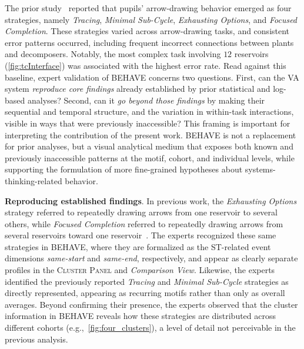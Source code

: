 \documentclass[letterpaper,journal]{IEEEtran}
\begin{document}
The prior study~\cite{host2026pupils} reported that pupils' arrow-drawing behavior emerged as four strategies, namely \textit{Tracing}, \textit{Minimal Sub-Cycle}, \textit{Exhausting Options}, and \textit{Focused Completion}. These strategies varied across arrow-drawing tasks, and consistent error patterns occurred, including frequent incorrect connections between plants and decomposers.
Notably, the most complex task involving $12$ reservoirs (\cref{fig:tcInterface}) was associated with the highest error rate.
Read against this baseline, expert validation of \textsc{BEHAVE} concerns two questions.
First, can the VA system \textit{reproduce core findings} already established by prior statistical and log-based analyses?
Second, can it \textit{go beyond those findings} by making their sequential and temporal structure, and the variation in within-task interactions, visible in ways that were previously inaccessible?
This framing is important for interpreting the contribution of the present work.
\textsc{BEHAVE} is not a replacement for prior analyses, but a visual analytical medium that exposes both known and previously inaccessible patterns at the motif, cohort, and individual levels, while supporting the formulation of more fine-grained hypotheses about systems-thinking-related behavior.

\noindent
\textbf{Reproducing established findings}.
In previous work, the \textit{Exhausting Options} strategy referred to repeatedly drawing arrows from one reservoir to several others, while \textit{Focused Completion} referred to repeatedly drawing arrows from several reservoirs toward one reservoir~\cite{host2026pupils}.
The experts recognized these same strategies in \textsc{BEHAVE}, where they are formalized as the ST-related event dimensions \textit{same-start} and \textit{same-end}, respectively, and appear as clearly separate profiles in the \textsc{Cluster Panel} and \textit{Comparison View}.
Likewise, the experts identified the previously reported \textit{Tracing} and \textit{Minimal Sub-Cycle} strategies as directly represented, appearing as recurring motifs rather than only as overall averages.
Beyond confirming their presence, the experts observed that the cluster information in \textsc{BEHAVE} reveals how these strategies are distributed across different cohorts (e.g.,~\cref{fig:four_clusters}), a level of detail not perceivable in the previous analysis.
\end{document}
